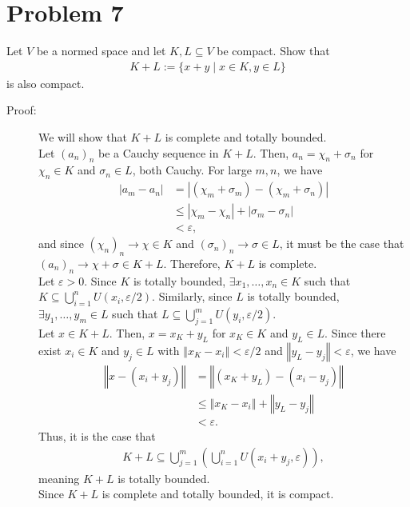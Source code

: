 \documentclass[10pt]{extarticle}
\newcommand{\norm}[1]{\left\Vert #1\right\Vert}
\begin{document}
  \section{Problem 7}%
  Let $V$ be a normed space and let $K,L\subseteq V$ be compact. Show that
  \begin{align*}
    K+L := \{x+y\mid x\in K,y\in L\}
  \end{align*}
  is also compact.
  \begin{description}
    \item[Proof:] We will show that $K+L$ is complete and totally bounded.\\

      Let $(a_n)_n$ be a Cauchy sequence in $K+L$. Then, $a_n = \chi_n + \sigma_n$  for $\chi_n\in K$ and $\sigma_n\in L$, both Cauchy. For large $m,n$, we have
      \begin{align*}
        |a_m - a_n| &= |(\chi_m + \sigma_m) - (\chi_m + \sigma_n)|\\
                    &\leq |\chi_m - \chi_n| + |\sigma_m - \sigma_n|\\
                    &< \varepsilon, 
      \end{align*}
      and since $(\chi_n)_n \rightarrow \chi\in K$ and $(\sigma_n)_n\rightarrow \sigma \in L$, it must be the case that $(a_n)_n \rightarrow \chi + \sigma \in K+L$. Therefore, $K+L$ is complete.\\

      Let $\varepsilon > 0$. Since $K$ is totally bounded, $\exists x_1,\dots,x_n\in K$ such that $K\subseteq \bigcup_{i=1}^{n} U(x_i,\varepsilon/2)$. Similarly, since $L$ is totally bounded, $\exists y_1,\dots,y_m\in L$ such that $L\subseteq \bigcup_{j=1}^{m}U(y_i,\varepsilon/2)$.\\

      Let $x\in K+L$. Then, $x = x_K + y_L$ for $x_K\in K$ and $y_L\in L$. Since there exist $x_i\in K$ and $y_j\in L$ with $\norm{x_K-x_i} < \varepsilon/2$ and $\norm{y_L-y_j}< \varepsilon$, we have
      \begin{align*}
        \norm{x - (x_i + y_j)} &= \norm{(x_K + y_L) - (x_i - y_j)}\\
                               &\leq \norm{x_K - x_i} + \norm{y_L - y_j}\\
                               &< \varepsilon.
      \end{align*}
      Thus, it is the case that
      \begin{align*}
        K+L \subseteq \bigcup_{j=1}^{m}\left(\bigcup_{i=1}^{n}U(x_i + y_j,\varepsilon)\right),
      \end{align*}
      meaning $K+L$ is totally bounded.\\

      Since $K+L$ is complete and totally bounded, it is compact.
  \end{description}
\end{document}
